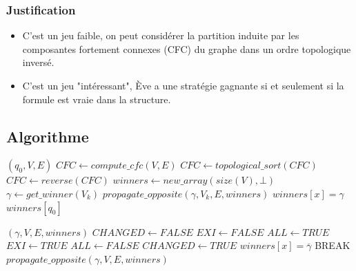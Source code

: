 \documentclass[11pt]{beamer}
\begin{document}
\begin{frame}
	\frametitle{Justification}
	\begin{itemize}
		\item C'est un jeu faible, on peut considérer la partition induite par les composantes fortement connexes (CFC) du graphe dans un ordre topologique inversé.
		\item C'est un jeu "intéressant", Ève a une stratégie gagnante si et seulement si la formule est vraie dans la structure.
	\end{itemize}
\end{frame}

\subsection{Algorithme}
\footnotesize
\begin{algorithm}[h!]
    \caption{$solve\_weak\_game$}
\begin{algorithmic}[1]
    \REQUIRE $(q_0, V, E)$ 
    \STATE $CFC \leftarrow compute\_cfc(V, E)$
    \STATE $CFC \leftarrow topological\_sort(CFC)$
    \STATE $CFC \leftarrow reverse(CFC)$
    \STATE $winners \leftarrow new\_array(size(V), \bot)$
        \STATE $\gamma \leftarrow get\_winner(V_k)$
        \STATE $propagate\_opposite(\gamma, V_k, E, winners)$
                \STATE $winners[x] = \gamma$
            \ENDIF
        \ENDFOR
    \ENDFOR
    \RETURN $winners[q_0]$
\end{algorithmic}
\end{algorithm}

\begin{algorithm}[h!]
\caption{$propagate\_opposite$}

\begin{algorithmic}[1]
    \scriptsize
    \REQUIRE $(\gamma, V, E, winners)$
    \STATE $CHANGED \leftarrow FALSE$
            \STATE $EXI \leftarrow FALSE$
            \STATE $ALL \leftarrow TRUE$
                    \STATE $EXI \leftarrow TRUE$
                \ELSE
                    \STATE $ALL \leftarrow FALSE$
                \ENDIF
            \ENDFOR
                \STATE $CHANGED \leftarrow TRUE$
                \STATE $winners[x] = \overline{\gamma}$
                \STATE BREAK 
            \ENDIF
        \ENDIF
    \ENDFOR
        \STATE $propagate\_opposite(\gamma, V, E, winners)$
    \ENDIF
    \RETURN
\end{algorithmic}
\end{algorithm}
\end{document}
